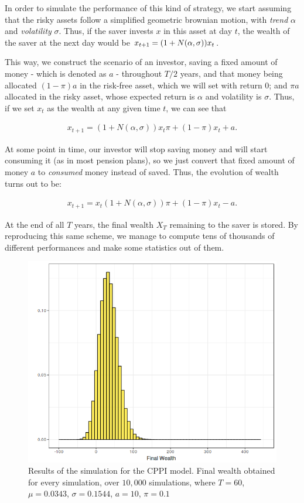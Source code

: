 In order to simulate the performance of this kind of strategy, we start assuming that the risky assets follow a simplified geometric brownian motion, with \emph{trend} $\alpha$ and \emph{volatility} $\sigma$. Thus, if the saver invests $x$ in this asset at day $t$, the wealth of the saver at the next day would be $x_{t+1} = (1 + N\qty(\alpha, \sigma)) x_t$.

This way, we construct the scenario of an investor, saving a fixed amount of money - which is denoted as $a$ -   throughout $T/2$ years, and that money being allocated $( 1 - \pi) a$ in the risk-free asset, which we will set with return 0; and $\pi a$ allocated in the risky asset, whose expected return is $\alpha$ and volatility is $\sigma$. Thus, if we set $x_t$ as the wealth at any given time $t$, we can see that

\begin{align}
	x_{t+1} = (1+N(\alpha, \sigma))x_{t}\pi + (1 - \pi)x_{t} + a \textit{.}
\end{align}

At some point in time, our investor will stop saving money and will start consuming it (as in most pension plans), so we just convert that fixed amount of money $a$ to \emph{consumed} money instead of saved. Thus, the evolution of wealth turns out to be:

\begin{align}
	x_{t+1} = x_{t}(1+N(\alpha, \sigma))\pi + (1 - \pi)x_{t} - a \textit{.}
\end{align}

At the end of all $T$ years, the final wealth $X_T$ remaining to the saver is stored. By reproducing this same scheme, we manage to compute tens of thousands of different performances and make some statistics out of them.

\begin{figure}[H]
    \centering
    \includegraphics[scale=0.65]{./images/fw_cppi.png}
    \caption{Results of the simulation for the CPPI model. Final wealth obtained for every simulation, over $10,000$ simulations, where $T=60$, $\mu = 0.0343$, $\sigma = 0.1544$, $a=10$, $\pi = 0.1$}
    \label{fig:cppi_fw}
\end{figure}

